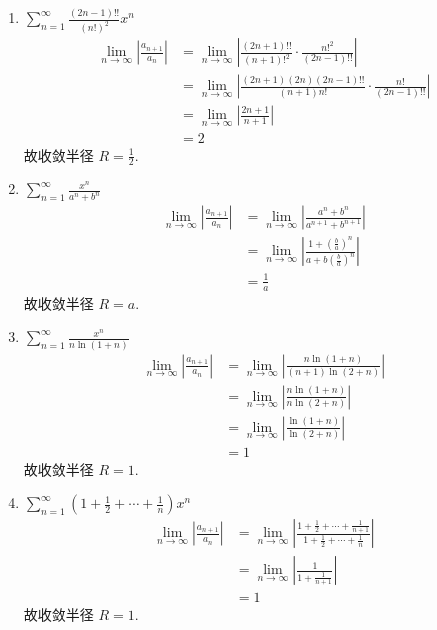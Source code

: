 \begin{solution}
    \begin{enumerate}
        \item \(\sum_{n=1}^{\infty} \frac{(2n-1)!!}{(n!)^2} x^n\)
            \begin{align*}
                \lim_{n \to \infty} \left| \frac{a_{n+1}}{a_n}
                \right| &= \lim_{n \to \infty} \left|
                \frac{(2n+1)!!}{(n+1)!^2} \cdot \frac{n!^2}{(2n-1)!!} \right| \\
                &= \lim_{n \to \infty} \left|
                \frac{(2n+1)(2n)(2n-1)!!}{(n+1)n!} \cdot
                \frac{n!}{(2n-1)!!} \right| \\
                &= \lim_{n \to \infty} \left| \frac{2n+1}{n+1} \right| \\
                &= 2
            \end{align*}
            故收敛半径 \(R = \frac{1}{2}\).
        \item \(\sum_{n=1}^{\infty} \frac{x^{n}}{a^{n} + b^{n}}\)
            \begin{align*}
                \lim_{n \to \infty} \left| \frac{a_{n+1}}{a_n}
                \right| &= \lim_{n \to \infty} \left| \frac{a^n +
                b^n}{a^{n+1} + b^{n+1}} \right| \\
                &= \lim_{n \to \infty} \left| \frac{1 +
                \left(\frac{b}{a}\right)^n}{a + b
                \left(\frac{b}{a}\right)^n} \right| \\
                &= \frac{1}{a}
            \end{align*}
            故收敛半径 \(R = a\).
        \item \(\sum_{n=1}^{\infty} \frac{x^n}{n \ln(1+n)}\)
            \begin{align*}
                \lim_{n \to \infty} \left| \frac{a_{n+1}}{a_n}
                \right| &= \lim_{n \to \infty} \left| \frac{n
                \ln(1+n)}{(n+1) \ln(2+n)} \right| \\
                &= \lim_{n \to \infty} \left| \frac{n \ln(1+n)}{n
                \ln(2+n)} \right| \\
                &= \lim_{n \to \infty} \left|
                \frac{\ln(1+n)}{\ln(2+n)} \right| \\
                &= 1
            \end{align*}
            故收敛半径 \(R = 1\).
        \item \(\sum_{n=1}^{\infty} \left(1 + \frac{1}{2} + \cdots +
            \frac{1}{n}\right) x^n\)
            \begin{align*}
                \lim_{n \to \infty} \left| \frac{a_{n+1}}{a_n}
                \right| &= \lim_{n \to \infty} \left| \frac{1 +
                \frac{1}{2} + \cdots + \frac{1}{n+1}}{1 + \frac{1}{2}
                + \cdots + \frac{1}{n}} \right| \\
                &= \lim_{n \to \infty} \left| \frac{1}{1 +
                \frac{1}{n+1}} \right| \\
                &= 1
            \end{align*}
            故收敛半径 \(R = 1\).
    \end{enumerate}
\end{solution}
